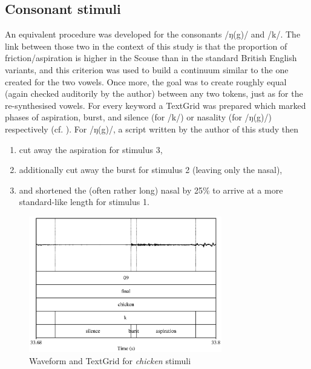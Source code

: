 \subsection{Consonant stimuli}\label{sec.perc_method.con}

An equivalent procedure was developed for the consonants /ŋ(g)/ and /k/.
The link between those two in the context of this study is that the proportion of friction/aspiration is higher in the Scouse than in the standard British English variants, and this criterion was used to build a continuum similar to the one created for the two vowels.
Once more, the goal was to create roughly equal  (again checked auditorily by the author) between any two tokens, just as for the re-synthesised vowels.
For every keyword a TextGrid was prepared which marked phases of aspiration, burst, and silence (for /k/) or nasality (for /ŋ(g)/) respectively (cf. ).
For /ŋ(g)/, a script written by the author of this study then

\begin{enumerate}
	\item cut away the aspiration for stimulus 3,
	\item additionally cut away the burst for stimulus 2 (leaving only the nasal),
	\item and shortened the (often rather long) nasal by 25\% to arrive at a more standard-like length for stimulus 1.
\end{enumerate}

\begin{figure}
	
	\includegraphics[width=0.75\textwidth]{./figures/chicken_spectrogram}
	\caption{Waveform and TextGrid for \emph{chicken} stimuli}
	\label{fig.chicken.spec}
\end{figure}

